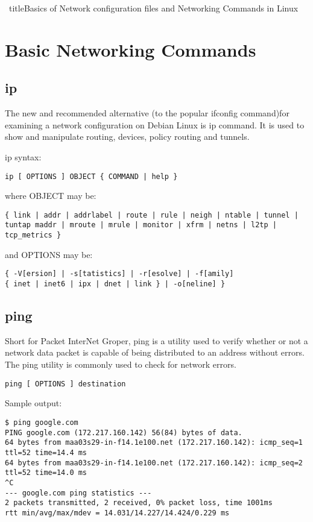 \documentclass[a4paper,12pt]{article}
\begin{document}
\	title{Basics of Network configuration files and Networking Commands in Linux}
\author{Yadhukrishnan M}
\date{\today}
\maketitle

\section{Basic Networking Commands}

\subsection{ip}
The new and recommended alternative (to the popular ifconfig command)for examining a network configuration on Debian Linux is ip command.
It is used to show and manipulate routing, devices, policy routing and tunnels.

ip syntax:
\begin{verbatim}
ip [ OPTIONS ] OBJECT { COMMAND | help }
\end{verbatim}

where OBJECT may be:
\begin{verbatim}
{ link | addr | addrlabel | route | rule | neigh | ntable | tunnel |
tuntap maddr | mroute | mrule | monitor | xfrm | netns | l2tp | tcp_metrics }
\end{verbatim}

and OPTIONS may be:
\begin{verbatim}
{ -V[ersion] | -s[tatistics] | -r[esolve] | -f[amily]
{ inet | inet6 | ipx | dnet | link } | -o[neline] }
\end{verbatim}

\subsection{ping}
 Short for Packet InterNet Groper, ping is a utility used to verify whether or not a network data packet is capable of being distributed to an address without errors. The ping utility is commonly used to check for network errors.
\begin{verbatim}
ping [ OPTIONS ] destination
\end{verbatim}

Sample output:
\begin{verbatim}
$ ping google.com
PING google.com (172.217.160.142) 56(84) bytes of data.
64 bytes from maa03s29-in-f14.1e100.net (172.217.160.142): icmp_seq=1 ttl=52 time=14.4 ms
64 bytes from maa03s29-in-f14.1e100.net (172.217.160.142): icmp_seq=2 ttl=52 time=14.0 ms
^C
--- google.com ping statistics ---
2 packets transmitted, 2 received, 0% packet loss, time 1001ms
rtt min/avg/max/mdev = 14.031/14.227/14.424/0.229 ms

\end{verbatim}
\end{document}
